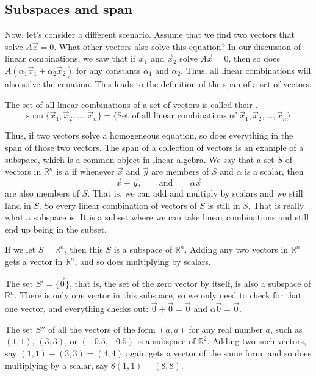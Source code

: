 \documentclass{ximera}
\begin{document}
\subsection{Subspaces and span}

Now, let's consider a different scenario. Assume that we find two vectors that solve $A\vec{x} = 0$. What other vectors also solve this equation? In our discussion of linear combinations, we saw that if $\vec{x}_1$ and $\vec{x}_2$ solve $A\vec{x} = 0$, then so does $A(\alpha_1\vec{x}_1 + \alpha_2\vec{x}_2)$ for any constants $\alpha_1$ and $\alpha_2$. Thus, all linear combinations will also solve the equation. This leads to the definition of the span of a set of vectors.

\begin{definition}
    The set of all linear combinations of a set of vectors is called their \emph{}.
    \begin{equation*}
        \operatorname{span} \bigl\{ \vec{x}_1, \vec{x}_2 , \ldots , \vec{x}_n \bigr\} = \bigl\{ \text{Set of all linear combinations of $\vec{x}_1, \vec{x}_2 , \ldots , \vec{x}_n$} \bigr\} .
    \end{equation*}
\end{definition}

Thus, if two vectors solve a homogeneous equation, so does everything in the span of those two vectors. The span of a collection of vectors is an example of a subspace, which is a common object in linear algebra. We say that a set $S$ of vectors in ${\mathbb R}^n$ is a \emph{} if whenever $\vec{x}$ and $\vec{y}$ are members of $S$ and $\alpha$ is a scalar, then
\begin{equation*}
    \vec{x} + \vec{y}, \qquad \text{and} \qquad \alpha \vec{x}
\end{equation*}
are also members of $S$.  That is, we can add and multiply by scalars and we still land in $S$.  So every linear combination of vectors of $S$ is still in $S$.  That is really what a subspace is.  It is a subset where we can take linear combinations and still end up being in the subset.

\begin{example} \label{example:simplesubspaces}
    If we let $S = {\mathbb R}^n$, then this $S$ is a subspace of ${\mathbb R}^n$.  Adding any two vectors in ${\mathbb R}^n$ gets a vector in ${\mathbb R}^n$, and so does multiplying by scalars.
    
    The set $S' = \{ \vec{0} \}$, that is, the set of the zero vector by itself, is  also a subspace of ${\mathbb R}^n$.  There is only one vector in this subspace, so we only need to check for that one vector, and everything checks out: $\vec{0}+\vec{0} = \vec{0}$ and $\alpha \vec{0} = \vec{0}$.
    
    The set $S''$ of all the vectors of the form $(a,a)$ for any real number $a$, such as $(1,1)$, $(3,3)$, or $(-0.5,-0.5)$ is a subspace of ${\mathbb R}^2$.  Adding two such vectors, say $(1,1)+(3,3) = (4,4)$ again gets a vector of the same form, and so does multiplying by a scalar, say $8(1,1) = (8,8)$.
\end{example}
\end{document}
